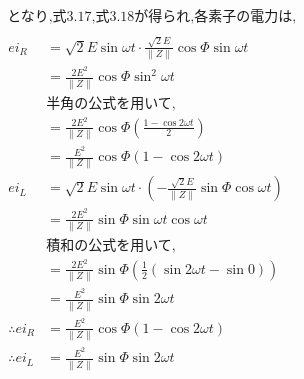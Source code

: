 \documentclass[twocolumn]{article}
\begin{document}
\begin{enumerate}
\begin{align*}
                        & \text{となり,式3.17,式3.18が得られ,各素子の電力は,}                                                                                             \\
        \end{align*}
        \begin{align*}
          ei_R            & = \sqrt{2}E\sin\omega t \cdot \frac{\sqrt{2}E}{\|Z\|}\cos\Phi\sin\omega t                     \\
                          & = \frac{2E^2}{\|Z\|}\cos\Phi\sin^2\omega t                                                    \\
                          & \text{半角の公式を用いて,}                                                                             \\
                          & = \frac{2E^2}{\|Z\|}\cos\Phi\left(\frac{1 - \cos 2\omega t}{2}\right)                         \\
                          & = \frac{E^2}{\|Z\|}\cos\Phi\left(1 - \cos 2\omega t\right)                                    \\
          ei_L            & = \sqrt{2}E\sin\omega t \cdot \left(-\frac{\sqrt{2}E}{\|Z\|} \sin \Phi \cos \omega t \right)  \\
                          & = \frac{2E^2}{\|Z\|} \sin\Phi \sin\omega t\cos\omega t                                        \\
                          & \text{積和の公式を用いて,}                                                                             \\
                          & = \frac{2E^2}{\|Z\|}\sin\Phi \left( \frac{1}{2} \left(\sin 2\omega t - \sin 0 \right) \right) \\
                          & = \frac{E^2}{\|Z\|}\sin\Phi\sin 2\omega t                                                     \\
          \therefore ei_R & = \frac{E^2}{\|Z\|}\cos\Phi\left(1 - \cos 2\omega t\right)                                    \\
          \therefore ei_L & = \frac{E^2}{\|Z\|}\sin\Phi\sin 2\omega t                                                     \\
        \end{align*}


\end{enumerate}
\end{document}
